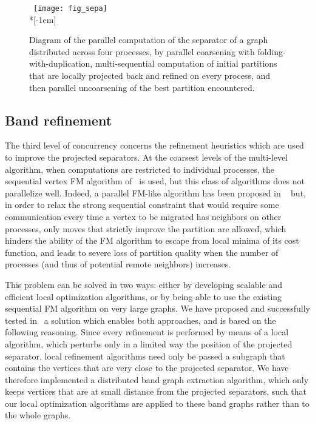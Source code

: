 \documentclass[fleqn,12pt,twoside]{article}
\begin{document}
\begin{figure}
~\hfill \texttt{[image: fig\_sepa]}
\hfill~\\*[-1em]
\caption{Diagram of the parallel computation of the separator of a
  graph distributed across four processes, by parallel coarsening
  with folding-with-duplication, multi-sequential computation of
  initial partitions that are locally projected back and refined on
  every process, and then parallel uncoarsening of the best
  partition encountered.}
\label{fig-sepa}
\end{figure}

\subsection{Band refinement}

The third level of concurrency concerns the refinement heuristics
which are used to improve the projected separators. At the coarsest
levels of the multi-level algorithm, when computations are restricted to
individual processes, the sequential vertex FM algorithm of \scotch\ is
used, but this class of algorithms does not parallelize well. Indeed,
a parallel FM-like algorithm has been proposed in
\parmetis~\cite{kaku96} but, in order to relax the strong
sequential constraint that would require some communication every time
a vertex to be migrated has neighbors on other processes, only moves
that strictly improve the partition are allowed, which hinders the
ability of the FM algorithm to escape from local minima of its cost
function, and leads to severe loss of partition quality when the
number of processes (and thus of potential remote neighbors)
increases.

This problem can be solved in two ways: either by developing
scalable and efficient local optimization algorithms, or by being able
to use the existing sequential FM algorithm on very large graphs. We
have proposed and successfully tested in~\cite{chpe06a} a solution
which enables both approaches, and is based on the following
reasoning. Since every refinement is performed by means of a local
algorithm, which perturbs only in a limited way the position of the
projected separator, local refinement algorithms need only be
passed a subgraph that contains the vertices that are very close to
the projected separator. We have therefore implemented a distributed
band graph extraction algorithm, which only keeps vertices that are at
small distance from the projected separators, such that our local
optimization algorithms are applied to these band graphs rather than
to the whole graphs.
\end{document}
